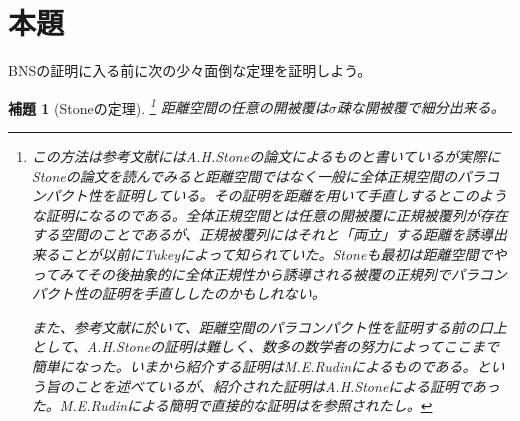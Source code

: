 \documentclass[leqno]{jsarticle}
\newtheorem{lem}[thm]{補題}
\begin{document}
\section{本題}
BNSの証明に入る前に次の少々面倒な定理を証明しよう。


\begin{lem}[Stoneの定理]\label{stone}\footnote{この方法は参考文献\cite{bi}にはA.H.Stoneの論文\cite{stone}によるものと書いているが実際にStoneの論文を読んでみると距離空間ではなく一般に全体正規空間のパラコンパクト性を証明している。その証明を距離を用いて手直しするとこのような証明になるのである。全体正規空間とは任意の開被覆に正規被覆列が存在する空間のことであるが、正規被覆列にはそれと「両立」する距離を誘導出来ることが\cite{stone}以前にTukeyによって知られていた。Stoneも最初は距離空間でやってみてその後抽象的に全体正規性から誘導される被覆の正規列でパラコンパクト性の証明を手直ししたのかもしれない。\par
また、参考文献\cite{tera}に於いて、距離空間のパラコンパクト性を証明する前の口上として、A.H.Stoneの証明は難しく、数多の数学者の努力によってここまで簡単になった。いまから紹介する証明はM.E.Rudinによるものである。という旨のことを述べているが、紹介された証明はA.H.Stoneによる証明であった。M.E.Rudinによる簡明で直接的な証明は\cite{Rudin}を参照されたし。}
距離空間の任意の開被覆は$\sigma$疎な開被覆で細分出来る。
\end{lem}
\end{document}
